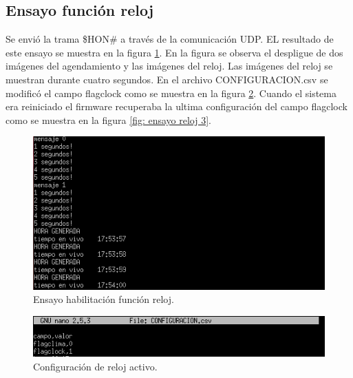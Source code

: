 \subsection{Ensayo función reloj}

Se envió la trama \$HON\# a través de la comunicación UDP. EL resultado de este ensayo se muestra en la figura \ref{fig: ensayo reloj 1}. En la figura se observa el despligue de dos imágenes del agendamiento y las imágenes del reloj. Las imágenes del reloj se muestran durante cuatro segundos. En el archivo CONFIGURACION.csv se modificó el campo flagclock como se muestra en la figura \ref{fig: ensayo reloj 2}. Cuando el sistema era reiniciado el firmware recuperaba la ultima configuración del campo flagclock como se muestra en la figura \ref{fig: ensayo reloj 3}. 

\begin{figure}[htpb]
	\centering
	\includegraphics[scale=0.8]{Figures/pruebareloj1.png} 
	\caption{Ensayo habilitación función reloj.}
	\label{fig: ensayo reloj 1}
\end{figure}

\begin{figure}[htpb]
	\centering
	\includegraphics[scale=0.8]{Figures/pruebareloj2.png} 
	\caption{Configuración de reloj activo.}
	\label{fig: ensayo reloj 2}
\end{figure}

